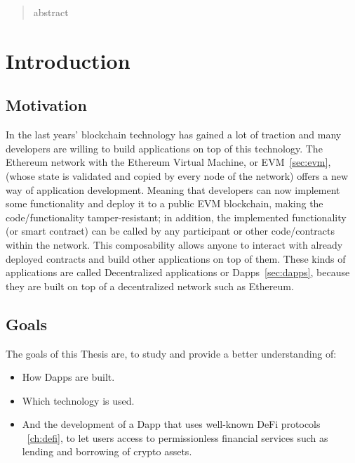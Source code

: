 \documentclass[11pt,a4paper]{report}
\begin{document}

\begin{abstract} 
abstract
\end{abstract}

\tableofcontents
\newpage 

\chapter{Introduction} \label{ch:intro}



\section{Motivation}
In the last years' blockchain technology has gained a lot of traction and many developers are willing to build applications on top of this technology.
The Ethereum network with the Ethereum Virtual Machine, or EVM~\ref{sec:evm}, (whose state is validated and copied by every node of the network) offers a new way of application development. Meaning that developers can now implement some functionality and deploy it to a public EVM blockchain, making the code/functionality tamper-resistant; in addition, the implemented functionality (or smart contract) can be called by any participant or other code/contracts within the network. This composability allows anyone to interact with already deployed contracts and build other applications on top of them. 
These kinds of applications are called Decentralized applications or Dapps~\ref{sec:dapps}, because they are built on top of a decentralized network such as  Ethereum.
\section{Goals}
The goals of this Thesis are, to study and provide a better understanding of: 
\begin{itemize}
	\item How Dapps are built.
	\item Which technology is used.
	\item And the development of a Dapp that uses well-known DeFi protocols ~\ref{ch:defi}, to let users access to permissionless financial services such as lending and borrowing of crypto assets.
\end{itemize}
\end{document}
